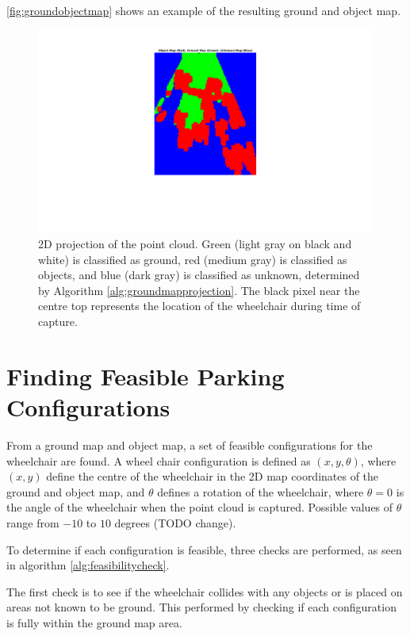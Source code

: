 \autoref{fig:groundobjectmap} shows an example of the resulting ground and
object map.

\begin{figure}
\centering
\includegraphics[width=5in]{figures/groundobjectmap.png}
\caption{2D projection of the point cloud. Green (light gray on black and white)
is classified as ground, red (medium gray) is classified as objects, and blue
(dark gray) is classified as unknown, determined by Algorithm
\autoref{alg:groundmapprojection}. The black pixel near the centre top
represents the location of the wheelchair during time of capture.}
\label{fig:groundobjectmap}
\end{figure}

\section{Finding Feasible Parking Configurations}
\label{sec:feasibleparkingspot}
From a ground map and object map, a set of feasible configurations for the
wheelchair are found. A wheel chair configuration is defined as $(x,y,\theta)$,
where $(x,y)$ define the centre of the wheelchair in the 2D map coordinates of
the ground and object map, and $\theta$ defines a rotation of the wheelchair,
where $\theta = 0$ is the angle of the wheelchair when the point cloud is
captured. Possible values of $\theta$ range from $-10$ to $10$ degrees (TODO
change).

To determine if each configuration is feasible, three checks are performed, as
seen in algorithm \autoref{alg:feasibilitycheck}. 

The first check is to see if the wheelchair
collides with any objects or is placed on areas not known to be ground. This
performed by checking if each configuration is fully within the ground map area.

